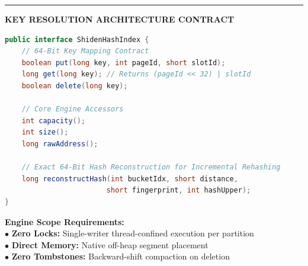 \documentclass[12pt]{article}
\begin{document}
\hfill
\begin{minipage}[t]{0.01\textwidth}
    \centering\color{shidenpurple!20}\rule{0.8pt}{2.1in}
\end{minipage}%
\hfill
\begin{minipage}[t]{0.48\textwidth}
    \vspace{0pt}
    {\fontsize{9}{11}\selectfont\color{shidenmuted}\textbf{KEY RESOLUTION ARCHITECTURE CONTRACT}\par}
    \vspace{1.5mm}
    
    \begin{lstlisting}[language=Java]
public interface ShidenHashIndex {
    // 64-Bit Key Mapping Contract
    boolean put(long key, int pageId, short slotId);
    long get(long key); // Returns (pageId << 32) | slotId
    boolean delete(long key);
    
    // Core Engine Accessors
    int capacity();
    int size();
    long rawAddress();
    
    // Exact 64-Bit Hash Reconstruction for Incremental Rehashing
    long reconstructHash(int bucketIdx, short distance, 
                        short fingerprint, int hashUpper);
}
    \end{lstlisting}
    
    \vspace{1mm}
    \fontsize{8.5}{10.5}\selectfont
    \noindent\textcolor{shidenaccent}{\textbf{Engine Scope Requirements:}}\\
    \textcolor{shidenpurple}{$\bullet$ \textbf{Zero Locks:}} Single-writer thread-confined execution per partition\\
    \textcolor{shidenpurple}{$\bullet$ \textbf{Direct Memory:}} Native off-heap segment placement\\
    \textcolor{shidenpurple}{$\bullet$ \textbf{Zero Tombstones:}} Backward-shift compaction on deletion
\end{minipage}
\clearpage
\end{document}

